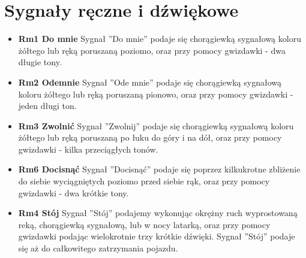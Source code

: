 \section{Sygnały ręczne i dźwiękowe}
\begin{itemize}
\item \textbf{Rm1 Do mnie}
Sygnał ''Do mnie'' podaje się chorągiewką sygnałową koloru żółtego lub ręką poruszaną poziomo, oraz przy pomocy gwizdawki - dwa długie tony.
\item \textbf{Rm2 Odemnie}
Sygnał ''Ode mnie'' podaje się chorągiewką sygnałową koloru żółtego lub ręką poruszaną pionowo, oraz przy pomocy gwizdawki - jeden długi ton.
\item \textbf{Rm3 Zwolnić}
Sygnał ''Zwolnij'' podaje się chorągiewką sygnałową koloru żółtego lub ręką poruszaną po łuku do góry i na dół, oraz przy pomocy gwizdawki - kilka przeciągłych tonów.
\item \textbf{Rm6 Docisnąć}
Sygnał ''Docisnąć'' podaje się poprzez kilkukrotne zbliżenie do siebie wyciągniętych poziomo przed siebie rąk, oraz przy pomocy gwizdawki - dwa krótkie tony.
\item \textbf{Rm4 Stój}
Sygnał ''Stój'' podajemy wykonując okrężny ruch wyprostowaną reką, chorągiewką sygnałową, lub w nocy latarką, oraz przy pomocy gwizdawki podając wielokrotnie trzy krótkie dźwięki. Sygnał ''Stój'' podaje się aż do całkowitego zatrzymania pojazdu.
\end{itemize}


